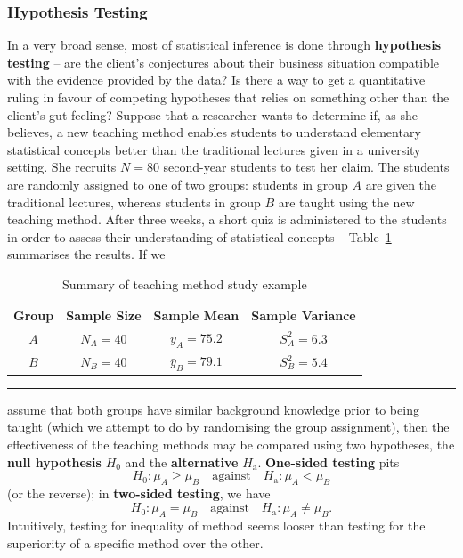 
\subsubsection{Hypothesis Testing}\label{sec:Hyp.Testing}
In a very broad sense, most of statistical inference is done through \textbf{hypothesis testing} -- are the client's conjectures about their business situation compatible with  the evidence provided by the data? Is there a way to get a quantitative ruling in favour of competing hypotheses that relies on something other than the client's gut feeling? \newl  Suppose that a researcher wants to determine if, as she believes, a new teaching method enables students to understand elementary statistical concepts better than the traditional lectures given in a university setting. She recruits  $N=80$ second-year students to test her claim. The students are randomly assigned to one of two groups: students in group $A$ are given the traditional lectures, whereas students in group $B$ are taught using the new teaching method. After three weeks, a short quiz is administered to the students in order to assess their understanding of statistical concepts -- Table~\ref{tab:SA1} summarises the results. 
\newpage \noindent If we
     \begin{table}[t]
      \centering
     
         \begin{tabular}{c c c c}
         \hline
         \textbf{Group} & \textbf{Sample Size} & \textbf{Sample Mean} & \textbf{Sample Variance} \\
         \hline
         $A$ & $N_{A} = 40$ & $\bar{y}_{A} = 75.2$ & $S^{2}_{A}=6.3$ \\
         $B$ & $N_{B} = 40$ & $\bar{y}_{B} = 79.1$ & $S^{2}_{B}=5.4$ \\
        \hline
         \end{tabular}
     \caption[\small Summary of teaching method study example]{\small Summary of teaching method study example}
         \label{tab:SA1}\hrule
    
     \end{table}
     \afterpage{\FloatBarrier}
assume that both groups have similar background knowledge prior to being taught (which we attempt to do by randomising the group assignment), then the effectiveness of the teaching methods may be compared using two hypotheses, the \textbf{null hypothesis} $H_0$ and the \textbf{alternative} $H_{\textrm{a}}$. \textbf{One-sided testing} pits $$H_{0}: \mu_{A} \geq \mu_{B}\quad\mbox{against}\quad H_{\textrm{a}}: \mu_{A} < \mu_{B}$$ (or the reverse); in \textbf{two-sided testing}, we have $$H_{0}: \mu_{A} = \mu_{B}\quad\mbox{against}\quad H_{\textrm{a}}: \mu_{A} \neq \mu_{B}.$$ Intuitively, testing for inequality of method seems looser than testing for the superiority of a specific method over the other. 
